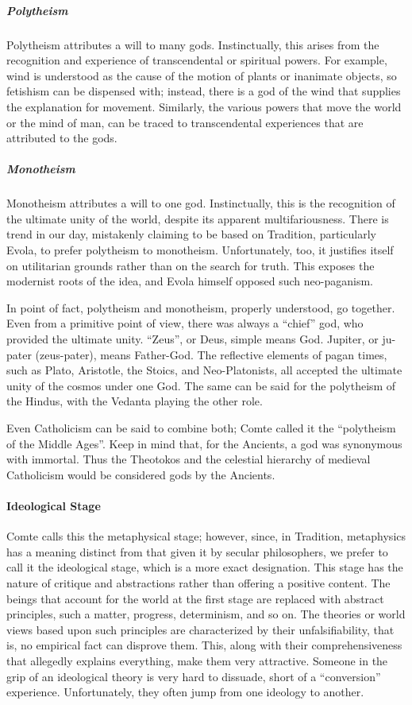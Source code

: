 \subparagraph{Polytheism}


Polytheism attributes a will to many gods. Instinctually, this arises from the recognition and experience of transcendental or spiritual powers. For example, wind is understood as the cause of the motion of plants or inanimate objects, so fetishism can be dispensed with; instead, there is a god of the wind that supplies the explanation for movement. Similarly, the various powers that move the world or the mind of man, can be traced to transcendental experiences that are attributed to the gods.

\subparagraph{Monotheism}


Monotheism attributes a will to one god. Instinctually, this is the recognition of the ultimate unity of the world, despite its apparent multifariousness. There is trend in our day, mistakenly claiming to be based on Tradition, particularly Evola, to prefer polytheism to monotheism. Unfortunately, too, it justifies itself on utilitarian grounds rather than on the search for truth. This exposes the modernist roots of the idea, and Evola himself opposed such neo-paganism.

In point of fact, polytheism and monotheism, properly understood, go together. Even from a primitive point of view, there was always a ``chief'' god, who provided the ultimate unity. ``Zeus'', or Deus, simple means God. Jupiter, or ju-pater (zeus-pater), means Father-God. The reflective elements of pagan times, such as Plato, Aristotle, the Stoics, and Neo-Platonists, all accepted the ultimate unity of the cosmos under one God. The same can be said for the polytheism of the Hindus, with the Vedanta playing the other role.

Even Catholicism can be said to combine both; Comte called it the ``polytheism of the Middle Ages''. Keep in mind that, for the Ancients, a god was synonymous with immortal. Thus the Theotokos and the celestial hierarchy of medieval Catholicism would be considered gods by the Ancients.

\paragraph{Ideological Stage}


Comte calls this the metaphysical stage; however, since, in Tradition, metaphysics has a meaning distinct from that given it by secular philosophers, we prefer to call it the ideological stage, which is a more exact designation. This stage has the nature of critique and abstractions rather than offering a positive content. The beings that account for the world at the first stage are replaced with abstract principles, such a matter, progress, determinism, and so on. The theories or world views based upon such principles are characterized by their unfalsifiability, that is, no empirical fact can disprove them. This, along with their comprehensiveness that allegedly explains everything, make them very attractive. Someone in the grip of an ideological theory is very hard to dissuade, short of a ``conversion'' experience. Unfortunately, they often jump from one ideology to another.


